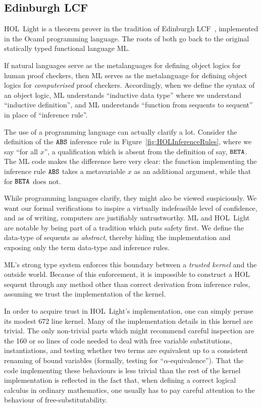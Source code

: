 \subsection{Edinburgh LCF}
HOL~Light is a theorem prover in the tradition of Edinburgh LCF~\cite{LCF}, implemented in the Ocaml programming language. The roots of both go back to the original statically typed functional language ML.

If natural languages serve as the metalanguages for defining object logics for human proof checkers, then ML serves as the metalanguage for defining object logics for \emph{computerised} proof checkers. Accordingly, when we define the syntax of an object logic, ML understands ``inductive data type'' where we understand ``inductive definition'', and ML understands ``function from sequents to sequent'' in place of ``inference rule''.

The use of a programming language can actually clarify a lot. Consider the definition of the $\texttt{ABS}$ inference rule in Figure~\ref{fig:HOLInferenceRules}, where we say ``for all $x$'', a qualification which is absent from the definition of say, $\texttt{BETA}$. The ML code makes the difference here very clear: the function implementing the inference rule $\texttt{ABS}$ takes a metavariable $x$ as an additional argument, while that for $\texttt{BETA}$ does not.

While programming languages clarify, they might also be viewed suspiciously. We want our formal verifications to inspire a virtually indefeasible level of confidence, and as of writing, computers are justifiably untrustworthy. ML and HOL~Light are notable by being part of a tradition which puts safety first. We define the data-type of sequents as \emph{abstract}, thereby hiding the implementation and exposing only the term data-type and inference rules.

ML's strong type system enforces this boundary between a \emph{trusted kernel} and the outside world. Because of this enforcement, it is impossible to construct a HOL sequent through any method other than correct derivation from inference rules, assuming we trust the implementation of the kernel. 

In order to acquire trust in HOL~Light's implementation, one can simply peruse its modest 672 line kernel. Many of the implementation details in this kernel are trivial. The only non-trivial parts which might recommend careful inspection are the 160 or so lines of code needed to deal with free variable substitutions, instantiations, and testing whether two terms are equivalent up to a consistent renaming of bound variables (formally, testing for ``$\alpha$-equivalence''). That the code implementing these behaviours is less trivial than the rest of the kernel implementation is reflected in the fact that, when defining a correct logical calculus in ordinary mathematics, one usually has to pay careful attention to the behaviour of free-substitutability.

